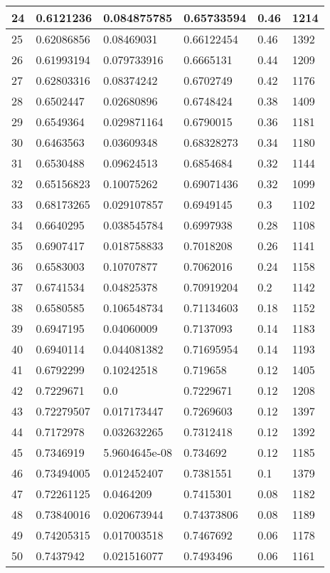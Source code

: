 \begin{longtable}{|l|l|l|l|l|l|}
24 & 0.6121236 & 0.084875785 & 0.65733594 & 0.46 & 1214 \\ \hline 
25 & 0.62086856 & 0.08469031 & 0.66122454 & 0.46 & 1392 \\ \hline 
26 & 0.61993194 & 0.079733916 & 0.6665131 & 0.44 & 1209 \\ \hline 
27 & 0.62803316 & 0.08374242 & 0.6702749 & 0.42 & 1176 \\ \hline 
28 & 0.6502447 & 0.02680896 & 0.6748424 & 0.38 & 1409 \\ \hline 
29 & 0.6549364 & 0.029871164 & 0.6790015 & 0.36 & 1181 \\ \hline 
30 & 0.6463563 & 0.03609348 & 0.68328273 & 0.34 & 1180 \\ \hline 
31 & 0.6530488 & 0.09624513 & 0.6854684 & 0.32 & 1144 \\ \hline 
32 & 0.65156823 & 0.10075262 & 0.69071436 & 0.32 & 1099 \\ \hline 
33 & 0.68173265 & 0.029107857 & 0.6949145 & 0.3 & 1102 \\ \hline 
34 & 0.6640295 & 0.038545784 & 0.6997938 & 0.28 & 1108 \\ \hline 
35 & 0.6907417 & 0.018758833 & 0.7018208 & 0.26 & 1141 \\ \hline 
36 & 0.6583003 & 0.10707877 & 0.7062016 & 0.24 & 1158 \\ \hline 
37 & 0.6741534 & 0.04825378 & 0.70919204 & 0.2 & 1142 \\ \hline 
38 & 0.6580585 & 0.106548734 & 0.71134603 & 0.18 & 1152 \\ \hline 
39 & 0.6947195 & 0.04060009 & 0.7137093 & 0.14 & 1183 \\ \hline 
40 & 0.6940114 & 0.044081382 & 0.71695954 & 0.14 & 1193 \\ \hline 
41 & 0.6792299 & 0.10242518 & 0.719658 & 0.12 & 1405 \\ \hline 
42 & 0.7229671 & 0.0 & 0.7229671 & 0.12 & 1208 \\ \hline 
43 & 0.72279507 & 0.017173447 & 0.7269603 & 0.12 & 1397 \\ \hline 
44 & 0.7172978 & 0.032632265 & 0.7312418 & 0.12 & 1392 \\ \hline 
45 & 0.7346919 & 5.9604645e-08 & 0.734692 & 0.12 & 1185 \\ \hline 
46 & 0.73494005 & 0.012452407 & 0.7381551 & 0.1 & 1379 \\ \hline 
47 & 0.72261125 & 0.0464209 & 0.7415301 & 0.08 & 1182 \\ \hline 
48 & 0.73840016 & 0.020673944 & 0.74373806 & 0.08 & 1189 \\ \hline 
49 & 0.74205315 & 0.017003518 & 0.7467692 & 0.06 & 1178 \\ \hline 
50 & 0.7437942 & 0.021516077 & 0.7493496 & 0.06 & 1161 \\ \hline 
\end{longtable}